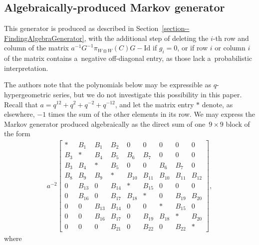 \documentclass[pdftex]{sigma}
\numberwithin{equation}{section}
\theoremstyle{definition}
\begin{document}
\subsection{Algebraically-produced Markov generator} \label{subsection-MarkovGen}
This generator is produced as described in Section~\ref{section--FindingAlgebraGenerator}, with the additional step of deleting the $i$-th row and column of the matrix $a^{-1}G^{-1}\pi_{W \otimes W}(C)G - \textrm{Id}$ if $g_i = 0$, or if row $i$ or column $i$ of the matrix contains a~negative off-diagonal entry, as those lack a~probabilistic interpretation.

The authors note that the polynomials below may be expressible as $q$-hypergeometric series, but we do not investigate this possibility in this paper. Recall that $a = q^{12} + q^2 + q^{-2} + q^{-12}$, and let the matrix entry $*$ denote, as elsewhere, $-1$ times the sum of the other elements in its row. We may express the Markov generator produced algebraically as the direct sum of one~${9 \times 9}$ block of the form
\begin{align*}
 a^{-2} \begin{bmatrix}
 * & B_1 & B_1 & B_2 & 0 & 0 & 0 & 0 & 0 \\
 B_3 & * & B_4 & B_5 & B_6 & B_7 & 0 & 0 & 0 \\
 B_3 & B_4 & * & B_5 & 0 & 0 & B_6 & B_7 & 0 \\
 B_8 & B_9 & B_9 & * & B_{10} & B_{11} & B_{10} & B_{11} & B_{12} \\
 0 & B_{13} & 0 & B_{14} & * & B_{15} & 0 & 0 & 0 \\
 0 & B_{16} & 0 & B_{17} & B_{18} & * & 0 & B_{19} & B_{20} \\
 0 & 0 & B_{13} & B_{14} & 0 & 0 & * & B_{15} & 0 \\
 0 & 0 & B_{16} & B_{17} & 0 & B_{19} & B_{18} & * & B_{20} \\
 0 & 0 & 0 & B_{21} & 0 & B_{22} & 0 & B_{22} & *
 \end{bmatrix},
\end{align*}
where
\end{document}
